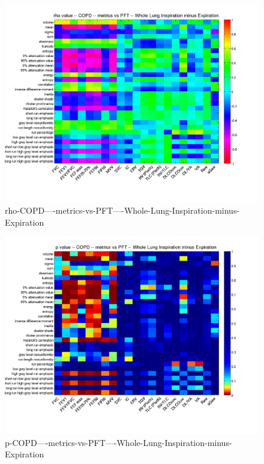 \documentclass[12pt]{article}
\begin{document}
\begin{figure}
    \includegraphics[width=0.84\linewidth,viewport=100 60 620 550]{corr/rho-COPD----metrics-vs-PFT----Whole-Lung-Inspiration-minus-Expiration.png}
    \caption{rho-COPD----metrics-vs-PFT----Whole-Lung-Inspiration-minus-Expiration}
    \label{fig:rho-COPD----metrics-vs-PFT----Whole-Lung-Inspiration-minus-Expiration}
\end{figure}
\begin{figure}
    \includegraphics[width=0.84\linewidth,viewport=100 60 620 550]{corr/p-COPD----metrics-vs-PFT----Whole-Lung-Inspiration-minus-Expiration.png}
    \caption{p-COPD----metrics-vs-PFT----Whole-Lung-Inspiration-minus-Expiration}
    \label{fig:p-COPD----metrics-vs-PFT----Whole-Lung-Inspiration-minus-Expiration}
\end{figure}
\end{document}
